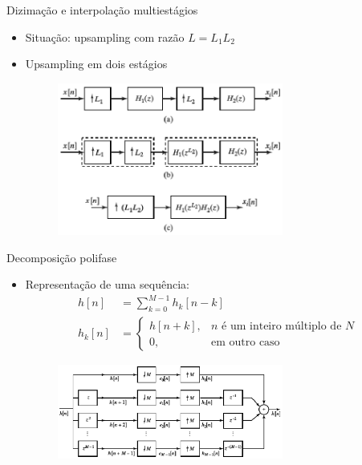 \begin{slide}{Dizimação e interpolação multiestágios}
	\begin{itemize}
		\item Situação: upsampling com razão $L = L_1L_2$
		\item Upsampling em dois estágios 
			\begin{figure}
				\centering
				\includegraphics[width=0.7\textwidth]{figs/4-34.eps}
			\end{figure}
	\end{itemize}
\end{slide}

\begin{slide}{Decomposição polifase}
	\begin{itemize}
		\item Representação de uma sequência:
			\begin{align*}
				h[n] &= \sum_{k=0}^{M-1} h_k[n-k]\\
				h_k[n] &= \begin{cases} h[n+k], & n \text{ é um inteiro múltiplo de } N\\
					                0, & \text{em outro caso}
					  \end{cases}
			\end{align*}
			\begin{figure}
				\centering
				\includegraphics[width=0.7\textwidth]{figs/4-35.eps}
			\end{figure}
	\end{itemize}
\end{slide}

